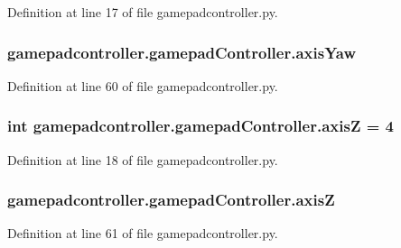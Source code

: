 Definition at line 17 of file gamepadcontroller.\-py.

\hypertarget{classgamepadcontroller_1_1gamepadController_a1bf5e24ecbf94d3a4ea99dd267b548bc}{
\subsubsection[{axis\-Yaw}]{\setlength{\rightskip}{0pt plus 5cm}gamepadcontroller.\-gamepad\-Controller.\-axis\-Yaw}}\label{classgamepadcontroller_1_1gamepadController_a1bf5e24ecbf94d3a4ea99dd267b548bc}


Definition at line 60 of file gamepadcontroller.\-py.

\hypertarget{classgamepadcontroller_1_1gamepadController_acd1ac84f9fc64a8e3ad69b5904b360c9}{
\subsubsection[{axis\-Z}]{\setlength{\rightskip}{0pt plus 5cm}int gamepadcontroller.\-gamepad\-Controller.\-axis\-Z = 4\hspace{0.3cm}{\ttfamily [static]}}}\label{classgamepadcontroller_1_1gamepadController_acd1ac84f9fc64a8e3ad69b5904b360c9}


Definition at line 18 of file gamepadcontroller.\-py.

\hypertarget{classgamepadcontroller_1_1gamepadController_af158dff2b0b9efc973c94c50c60ac938}{
\subsubsection[{axis\-Z}]{\setlength{\rightskip}{0pt plus 5cm}gamepadcontroller.\-gamepad\-Controller.\-axis\-Z}}\label{classgamepadcontroller_1_1gamepadController_af158dff2b0b9efc973c94c50c60ac938}


Definition at line 61 of file gamepadcontroller.\-py.

